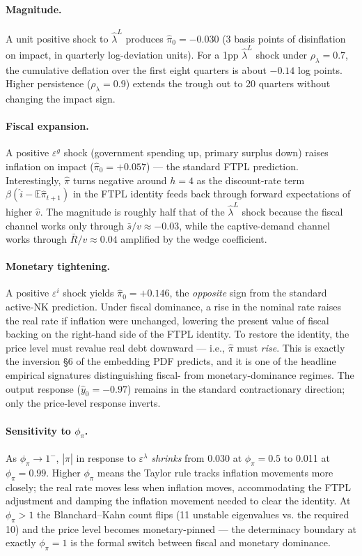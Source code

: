 \documentclass[11pt,a4paper]{article}
\newcommand{\E}{\mathbb{E}}
\newcommand{\hpi}{\hat{\pi}}
\newcommand{\hv}{\hat{v}}
\newcommand{\hlam}{\hat{\lambda}^{L}}
\begin{document}
\paragraph{Magnitude.} A unit positive shock to $\hlam$ produces $\hpi_0 = -0.030$ (3 basis points of disinflation on impact, in quarterly log-deviation units). For a 1pp $\hat\lambda^L$ shock under $\rho_\lambda = 0.7$, the cumulative deflation over the first eight quarters is about $-0.14$ log points. Higher persistence ($\rho_\lambda = 0.9$) extends the trough out to 20 quarters without changing the impact sign.

\paragraph{Fiscal expansion.} A positive $\varepsilon^g$ shock (government spending up, primary surplus down) raises inflation on impact ($\hpi_0 = +0.057$) --- the standard FTPL prediction. Interestingly, $\hpi$ turns negative around $h=4$ as the discount-rate term $\beta(\hat i - \E \hpi_{t+1})$ in the FTPL identity feeds back through forward expectations of higher $\hv$. The magnitude is roughly half that of the $\hlam$ shock because the fiscal channel works only through $\bar s/v \approx -0.03$, while the captive-demand channel works through $\bar R/v \approx 0.04$ amplified by the wedge coefficient.

\paragraph{Monetary tightening.} A positive $\varepsilon^i$ shock yields $\hpi_0 = +0.146$, the \textit{opposite} sign from the standard active-NK prediction. Under fiscal dominance, a rise in the nominal rate raises the real rate if inflation were unchanged, lowering the present value of fiscal backing on the right-hand side of the FTPL identity. To restore the identity, the price level must revalue real debt downward --- i.e., $\hpi$ must \textit{rise}. This is exactly the inversion §6 of the embedding PDF predicts, and it is one of the headline empirical signatures distinguishing fiscal- from monetary-dominance regimes. The output response ($\hat y_0 = -0.97$) remains in the standard contractionary direction; only the price-level response inverts.

\paragraph{Sensitivity to $\phi_\pi$.} As $\phi_\pi \to 1^-$, $|\hpi|$ in response to $\varepsilon^\lambda$ \textit{shrinks} from 0.030 at $\phi_\pi = 0.5$ to 0.011 at $\phi_\pi = 0.99$. Higher $\phi_\pi$ means the Taylor rule tracks inflation movements more closely; the real rate moves less when inflation moves, accommodating the FTPL adjustment and damping the inflation movement needed to clear the identity. At $\phi_\pi > 1$ the Blanchard--Kahn count flips (11 unstable eigenvalues vs. the required 10) and the price level becomes monetary-pinned --- the determinacy boundary at exactly $\phi_\pi = 1$ is the formal switch between fiscal and monetary dominance.
\end{document}
